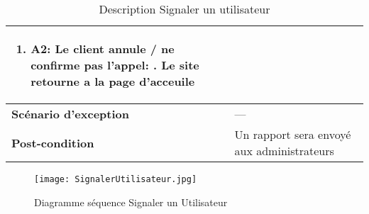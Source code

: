 \begin{center}
\begin{table}[H]
{\begin{tabular}{ | l | m{0.51\textheight}|}
{\begin{enumerate}
						\item \textbf{A2: Le client annule / ne confirme pas l'appel:}
						\subitem 5. Le site retourne a la page d'acceuile
				\end{enumerate}}\\
				\hline
				\cellcolor[HTML]{99ccff} \textbf{Scénario d'exception} & --- \\
				\hline
				\cellcolor[HTML]{99ccff} \textbf{Post-condition} & Un rapport sera envoyé aux administrateurs\\
				\hline
		\end{tabular}}
		\caption{Description Signaler un utilisateur}
		\label{table:signaler utilisateur}
	\end{table}
	\begin{figure}[H]
		\centering
		\texttt{[image: SignalerUtilisateur.jpg]}
		\caption{Diagramme séquence Signaler un Utilisateur}
		\label{fig:seq signaler utilisateur}
	\end{figure}
\end{center}


